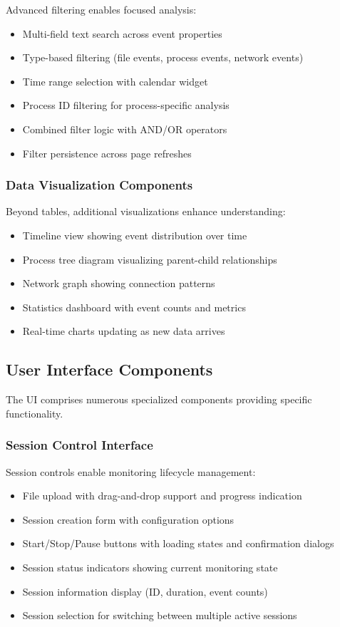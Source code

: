 Advanced filtering enables focused analysis:

\begin{itemize}
    \item Multi-field text search across event properties
    \item Type-based filtering (file events, process events, network events)
    \item Time range selection with calendar widget
    \item Process ID filtering for process-specific analysis
    \item Combined filter logic with AND/OR operators
    \item Filter persistence across page refreshes
\end{itemize}

\subsubsection{Data Visualization Components}

Beyond tables, additional visualizations enhance understanding:

\begin{itemize}
    \item Timeline view showing event distribution over time
    \item Process tree diagram visualizing parent-child relationships
    \item Network graph showing connection patterns
    \item Statistics dashboard with event counts and metrics
    \item Real-time charts updating as new data arrives
\end{itemize}

\subsection{User Interface Components}

The UI comprises numerous specialized components providing specific functionality.

\subsubsection{Session Control Interface}

Session controls enable monitoring lifecycle management:

\begin{itemize}
    \item File upload with drag-and-drop support and progress indication
    \item Session creation form with configuration options
    \item Start/Stop/Pause buttons with loading states and confirmation dialogs
    \item Session status indicators showing current monitoring state
    \item Session information display (ID, duration, event counts)
    \item Session selection for switching between multiple active sessions
\end{itemize}

